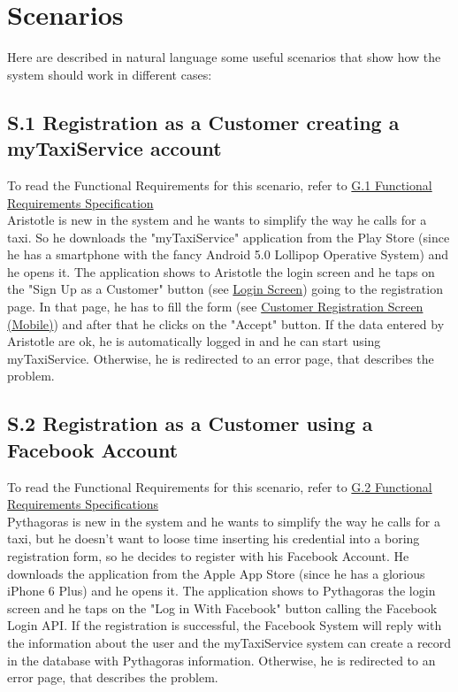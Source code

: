 \section{Scenarios}\label{sec:SectionScenarios}
	Here are described in natural language some useful scenarios that show how the system should work in different cases:

		\subsection{S.1 Registration as a Customer creating a myTaxiService account}\label{sec:NormalCustomerRegistrationScenario}
		To read the Functional Requirements for this scenario, refer to \hyperref[sec:frs1]{G.1 Functional Requirements Specification}\\

		Aristotle is new in the system and he wants to simplify the way he calls for a taxi. So he downloads the "myTaxiService" application from the Play Store (since he has a smartphone with the fancy Android 5.0 Lollipop Operative System) and he opens it.
		The application shows to Aristotle the login screen and he taps on the "Sign Up as a Customer" button (see \hyperref[login_m]{Login Screen}) going to the registration page. In that page, he has to fill the form (see \hyperref[cregistration_m]{Customer Registration Screen (Mobile)}) and after that he clicks on the "Accept" button. If the data entered by Aristotle are ok, he is automatically logged in and he can start using myTaxiService. Otherwise, he is redirected to an error page, that describes the problem. 

		\subsection{S.2 Registration as a Customer using a Facebook Account}\label{sec:FacebookCustomerRegistrationScenario}
		To read the Functional Requirements for this scenario, refer to \hyperref[sec:frs2]{G.2 Functional Requirements Specifications}\\

		Pythagoras is new in the system and he wants to simplify the way he calls for a taxi, but he doesn't want to loose time inserting his credential into a boring registration form, so he decides to register with his Facebook Account.
		He downloads the application from the Apple App Store (since he has a glorious iPhone 6 Plus) and he opens it.
		The application shows to Pythagoras the login screen and he taps on the "Log in With Facebook" button calling the Facebook Login API.
		If the registration is successful, the Facebook System will reply with the information about the user and the myTaxiService system can create a record in the database with Pythagoras information. Otherwise, he is redirected to an error page, that describes the problem.

